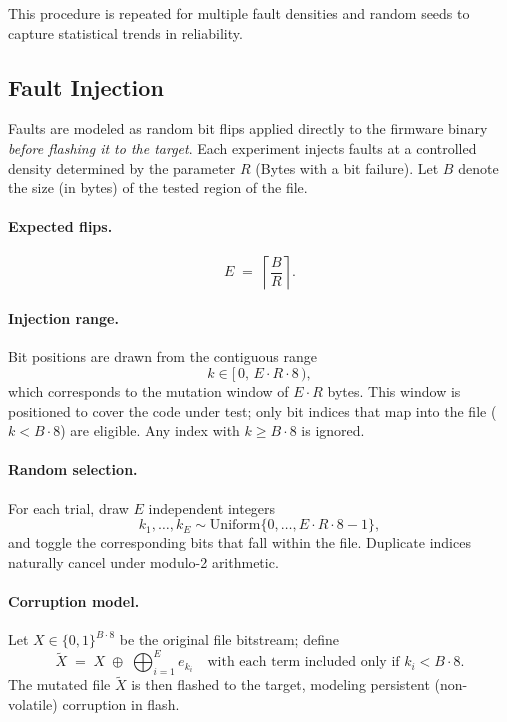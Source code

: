 This procedure is repeated for multiple fault densities and random seeds to
capture statistical trends in reliability.

\subsection{Fault Injection}
\label{sec:fault-injection}

Faults are modeled as random bit flips applied directly to the firmware binary \emph{before flashing it to the target}.
Each experiment injects faults at a controlled density determined by the
parameter \(R\) (Bytes with a bit failure). Let \(B\) denote the size (in bytes) of the
tested region of the file.

\paragraph{Expected flips.}
\[
  E \;=\; \left\lceil \frac{B}{R} \right\rceil .
\]

\paragraph{Injection range.}
Bit positions are drawn from the contiguous range
\[
  k \in [\,0,\, E \cdot R \cdot 8\,),
\]
which corresponds to the mutation window of \(E \cdot R\) bytes.
This window is positioned to cover the code under test; only bit indices that
map into the file (\(k < B \cdot 8\)) are eligible. Any index with
\(k \ge B \cdot 8\) is ignored.

\paragraph{Random selection.}
For each trial, draw \(E\) independent integers
\[
  k_1, \dots, k_E \sim \mathrm{Uniform}\{0, \dots, E \cdot R \cdot 8 - 1\},
\]
and toggle the corresponding bits that fall within the file. Duplicate indices
naturally cancel under modulo-2 arithmetic.

\paragraph{Corruption model.}
Let \(X \in \{0,1\}^{B \cdot 8}\) be the original file bitstream; define
\[
  \widetilde{X}
  \;=\;
  X \;\oplus\; \bigoplus_{i=1}^{E} e_{k_i}
  \quad \text{with each term included only if } k_i < B \cdot 8.
\]
The mutated file \(\widetilde{X}\) is then flashed to the target, modeling
persistent (non-volatile) corruption in flash.



